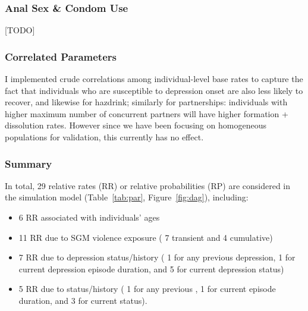 \subsubsection{Anal Sex \& Condom Use}
[TODO]
\subsubsection{Correlated Parameters}
\note{[TODO]}
     {I implemented crude correlations among individual-level base rates to capture the fact that
      individuals who are susceptible to depression onset are also less likely to recover,
      and likewise for hazdrink; similarly for partnerships:
      individuals with higher maximum number of concurrent partners
      will have higher formation + dissolution rates.
      However since we have been focusing on homogeneous populations for validation,
      this currently has no effect.}
\subsubsection{Summary}\label{mod.par.evt.sum}
In total, 29 relative rates (RR) or relative probabilities (RP) are considered
in the simulation model (Table~\ref{tab:par}, Figure~\ref{fig:dag}), including:
\begin{itemize}
  \item 6 RR associated with individuals' ages
  \item 11 RR due to SGM violence exposure (%
    7 transient and 4 cumulative)
  \item 7 RR due to depression status/history (%
    1 for any previous depression,
    1 for current depression episode duration, and
    5 for current depression status)
  \item 5 RR due to \hazdrink status/history (%
    1 for any previous \hazdrink,
    1 for current \hazdrink episode duration, and
    3 for current \hazdrink status).
\end{itemize}
